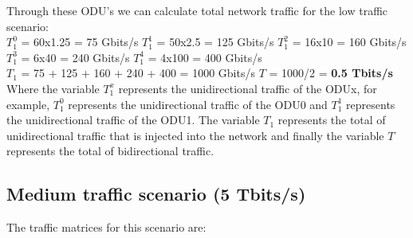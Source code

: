 \vspace{17pt}
Through these ODU's we can calculate total network traffic for the low traffic scenario:\\

$T_1^0$ = 60x1.25 = 75 Gbits/s \qquad
$T_1^1$ = 50x2.5 = 125 Gbits/s \qquad
$T_1^2$ = 16x10 = 160 Gbits/s \\

$T_1^3$ = 6x40 = 240 Gbits/s \quad
$T_1^4$ = 4x100 = 400 Gbits/s \\

$T_{1}$ = 75 + 125 + 160 + 240 + 400 = 1000 Gbits/s \qquad
$T$ = 1000/2 = \textbf{0.5 Tbits/s}\\

Where the variable $T_1^x$ represents the unidirectional traffic of the ODUx, for example, $T_1^0$ represents the unidirectional traffic of the ODU0 and $T_1^1$ represents the unidirectional traffic of the ODU1. The variable $T_{1}$ represents the total of unidirectional traffic that is injected into the network and finally the variable $T$ represents the total of bidirectional traffic.\\

\subsection{Medium traffic scenario (5 Tbits/s)}\label{medium_traffic_scenario}

The traffic matrices for this scenario are:

